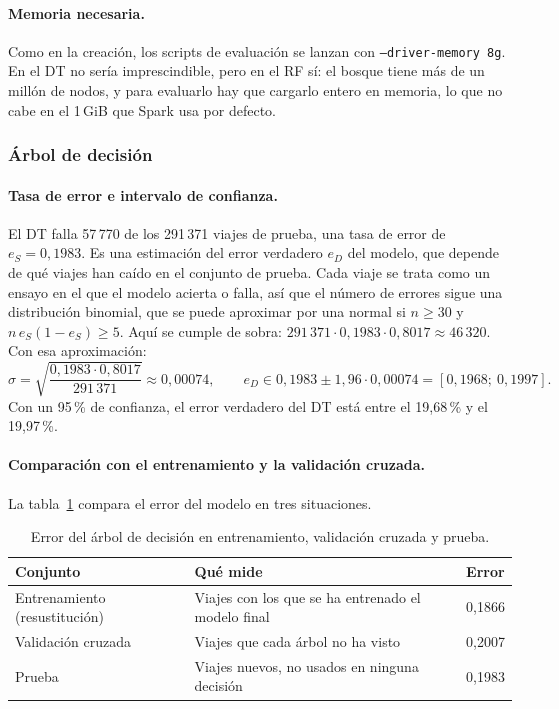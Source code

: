 \documentclass[12pt,a4paper]{article}
\begin{document}
\paragraph{Memoria necesaria.} Como en la creación, los scripts de
evaluación se lanzan con \texttt{--driver-memory 8g}. En el \ac{DT} no
sería imprescindible, pero en el \ac{RF} sí: el bosque tiene más de un
millón de nodos, y para evaluarlo hay que cargarlo entero en memoria, lo
que no cabe en el 1\,GiB que Spark usa por defecto.



\subsubsection{Árbol de decisión}
\label{sec:eval-dt}
 
\paragraph{Tasa de error e intervalo de confianza.} El \ac{DT} falla
57\,770 de los 291\,371 viajes de prueba, una tasa de error de
$e_S = 0{,}1983$. Es una estimación del error verdadero $e_D$ del modelo,
que depende de qué viajes han caído en el conjunto de prueba. Cada viaje
se trata como un ensayo en el que el modelo acierta o falla, así que el
número de errores sigue una distribución binomial, que se puede aproximar
por una normal si $n \geq 30$ y $n\,e_S(1-e_S) \geq 5$\cite[cap.~5]{mitchell1997}.
Aquí se cumple de sobra: $291\,371 \cdot 0{,}1983 \cdot 0{,}8017 \approx
46\,320$. Con esa aproximación:
\[
\sigma = \sqrt{\frac{0{,}1983 \cdot 0{,}8017}{291\,371}} \approx 0{,}00074,
\qquad
e_D \in 0{,}1983 \pm 1{,}96 \cdot 0{,}00074 = [0{,}1968;\ 0{,}1997] .
\]
Con un 95\,\% de confianza, el error verdadero del \ac{DT} está entre el
19,68\,\% y el 19,97\,\%.
 
\paragraph{Comparación con el entrenamiento y la validación cruzada.} La
tabla~\ref{tab:errores-dt} compara el error del modelo en tres situaciones.
 
\begin{table}[H]
\centering
\small
\begin{tabular}{lll}
\toprule
\textbf{Conjunto} & \textbf{Qué mide} & \textbf{Error} \\
\midrule
Entrenamiento (resustitución) & Viajes con los que se ha entrenado el modelo final & 0,1866 \\
Validación cruzada & Viajes que cada árbol no ha visto & 0,2007 \\
Prueba & Viajes nuevos, no usados en ninguna decisión & 0,1983 \\
\bottomrule
\end{tabular}
\caption{Error del árbol de decisión en entrenamiento, validación cruzada y prueba.}
\label{tab:errores-dt}
\end{table}
 
\end{document}
